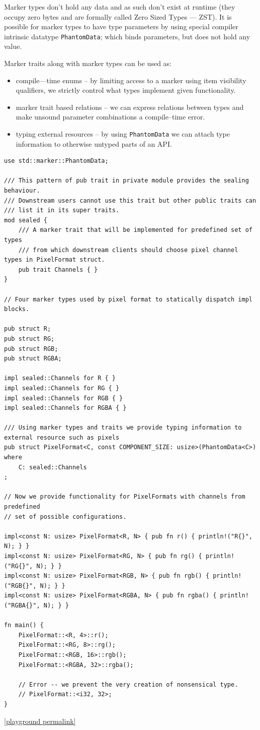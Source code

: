 Marker types don't hold any data and as such don't exist at runtime (they occupy zero bytes and are formally called Zero Sized Types --- ZST).
It is possible for marker types to have type parameters by using special compiler intrinsic datatype \texttt{PhantomData}; which binds parameters, but does not hold any value.

Marker traits along with marker types can be used as:
\begin{itemize}
    \item compile---time enums -- by limiting access to a marker using item visibility qualifiers, we strictly control what types implement given functionality.
    \item marker trait based relations -- we can express relations between types and make unsound parameter combinations a compile--time error.
    \item typing external resources -- by using \texttt{PhantomData} we can attach type information to otherwise untyped parts of an API.
\end{itemize}

\begin{lstlisting}
use std::marker::PhantomData;

/// This pattern of pub trait in private module provides the sealing behaviour.
/// Downstream users cannot use this trait but other public traits can
/// list it in its super traits.
mod sealed {
    /// A marker trait that will be implemented for predefined set of types
    /// from which downstream clients should choose pixel channel types in PixelFormat struct.
    pub trait Channels { }
}

// Four marker types used by pixel format to statically dispatch impl blocks.

pub struct R;
pub struct RG;
pub struct RGB;
pub struct RGBA;

impl sealed::Channels for R { }
impl sealed::Channels for RG { }
impl sealed::Channels for RGB { }
impl sealed::Channels for RGBA { }

/// Using marker types and traits we provide typing information to external resource such as pixels
pub struct PixelFormat<C, const COMPONENT_SIZE: usize>(PhantomData<C>)
where 
    C: sealed::Channels
;

// Now we provide functionality for PixelFormats with channels from predefined
// set of possible configurations.

impl<const N: usize> PixelFormat<R, N> { pub fn r() { println!("R{}", N); } }
impl<const N: usize> PixelFormat<RG, N> { pub fn rg() { println!("RG{}", N); } }
impl<const N: usize> PixelFormat<RGB, N> { pub fn rgb() { println!("RGB{}", N); } }
impl<const N: usize> PixelFormat<RGBA, N> { pub fn rgba() { println!("RGBA{}", N); } }

fn main() {
    PixelFormat::<R, 4>::r();
    PixelFormat::<RG, 8>::rg();
    PixelFormat::<RGB, 16>::rgb();
    PixelFormat::<RGBA, 32>::rgba();
    
    // Error -- we prevent the very creation of nonsensical type.
    // PixelFormat::<i32, 32>;
}
\end{lstlisting}
\noindent \href{https://play.rust-lang.org/?version=stable&mode=debug&edition=2021&gist=7d092a3be5593833894fa27b5fa56757}{[playground permalink]}

